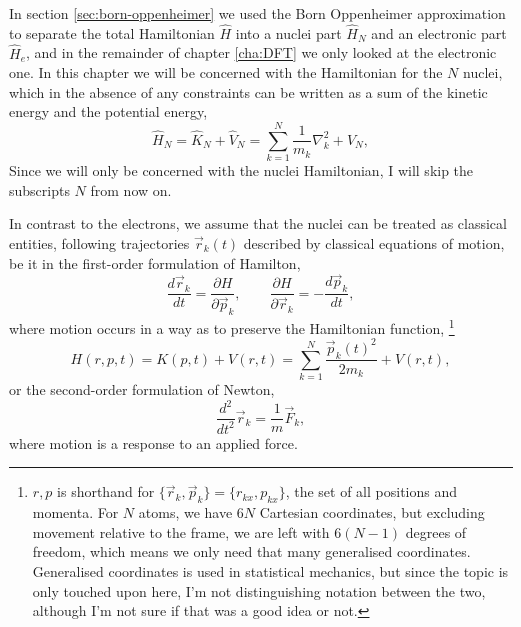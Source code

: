 \documentclass[11pt,bibliography=totoc,index=totoc]{scrbook}   %
\begin{document}
In section \ref{sec:born-oppenheimer} we used the Born Oppenheimer approximation to separate the total Hamiltonian $\hat{H}$ into a nuclei part $\hat{H}_N$ and an electronic part $\hat{H}_e$, and in the remainder of chapter \ref{cha:DFT} we only looked at the electronic one.
In this chapter we will be concerned with the Hamiltonian for the $N$ nuclei, which in the absence of any constraints can be written
as a sum of the kinetic energy and the potential energy,
\begin{equation}
    \hat{H}_N = \hat{K}_N + \hat{V}_N = \sum_{k=1}^N \frac{1}{m_k}\nabla_k^2 + V_N,
\end{equation}
Since we will only be concerned with the nuclei Hamiltonian, I will skip the subscripts $N$ from now on.

In contrast to the electrons, we assume that the nuclei can be treated as classical entities, following trajectories $\vec{r}_k(t)$ 
described by classical equations of motion, be it in the first-order formulation of Hamilton,
\begin{equation}
    \frac{d\vec{r}_k}{dt} = \frac{\partial H}{\partial \vec{p}_k}, \qquad
    \frac{\partial H}{\partial \vec{r}_k} = -\frac{d\vec{p}_k}{dt},
\end{equation}
where motion occurs in a way as to preserve the Hamiltonian function,
\footnote{
    $r,p$ is shorthand for $\{\vec{r}_k, \vec{p}_k\} = \{r_{kx}, p_{kx}\}$, the set of all positions and momenta.
    For $N$ atoms, we have $6N$ Cartesian coordinates, but excluding movement relative to the frame,
    we are left with $6(N-1)$ degrees of freedom, which means we only need that many generalised coordinates.
    Generalised coordinates is used in statistical mechanics, but since the topic is only touched upon here, 
    I'm not distinguishing notation between the two, although I'm not sure if that was a good idea or not.
}
\begin{equation}
    H(r,p,t) = K(p,t) + V(r,t) = \sum_{k=1}^N \frac{\vec{p}_k(t)^2}{2m_k} + V(r,t),
  \label{eq:nucleiHamiltonian}
\end{equation}
or the second-order formulation of Newton,
\begin{equation}
  \frac{d^2}{d t^2} \vec{r}_k = \frac{1}{m}\vec{F}_k,
  \label{eq:newton2nd}
\end{equation}
where motion is a response to an applied force.
\end{document}
